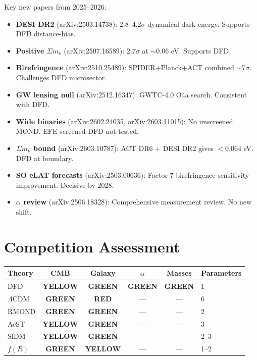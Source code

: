 \documentclass[11pt,a4paper]{article}
\newcommand{\GREEN}{\textcolor{dfdgreen}{\textbf{GREEN}}}
\newcommand{\YELLOW}{\textcolor{dfdyellow}{\textbf{YELLOW}}}
\newcommand{\RED}{\textcolor{dfdred}{\textbf{RED}}}
\begin{document}
Key new papers from 2025--2026:
\begin{itemize}
\item \textbf{DESI DR2} (arXiv:2503.14738): $2.8$--$4.2\sigma$ dynamical dark energy. Supports DFD distance-bias.
\item \textbf{Positive $\Sigma m_\nu$} (arXiv:2507.16589): $2.7\sigma$ at $\sim 0.06$ eV. Supports DFD.
\item \textbf{Birefringence} (arXiv:2510.25489): SPIDER+Planck+ACT combined $\sim 7\sigma$. Challenges DFD microsector.
\item \textbf{GW lensing null} (arXiv:2512.16347): GWTC-4.0 O4a search. Consistent with DFD.
\item \textbf{Wide binaries} (arXiv:2602.24035, arXiv:2603.11015): No unscreened MOND. EFE-screened DFD not tested.
\item \textbf{$\Sigma m_\nu$ bound} (arXiv:2603.10787): ACT DR6 + DESI DR2 gives $< 0.064$ eV. DFD at boundary.
\item \textbf{SO eLAT forecasts} (arXiv:2503.00636): Factor-7 birefringence sensitivity improvement. Decisive by 2028.
\item \textbf{$\alpha$ review} (arXiv:2506.18328): Comprehensive measurement review. No new shift.
\end{itemize}


\section{Competition Assessment}

\begin{center}
\begin{tabular}{lccccl}
\toprule
\textbf{Theory} & \textbf{CMB} & \textbf{Galaxy} & \textbf{$\alpha$} & \textbf{Masses} & \textbf{Parameters} \\
\midrule
DFD & \YELLOW & \GREEN & \GREEN & \GREEN & 1 \\
$\Lambda$CDM & \GREEN & \RED & --- & --- & 6 \\
RMOND & \GREEN & \GREEN & --- & --- & 2 \\
AeST & \YELLOW & \GREEN & --- & --- & 3 \\
SfDM & \YELLOW & \GREEN & --- & --- & 2--3 \\
$f(R)$ & \GREEN & \YELLOW & --- & --- & 1--2 \\
\bottomrule
\end{tabular}
\end{center}
\end{document}

